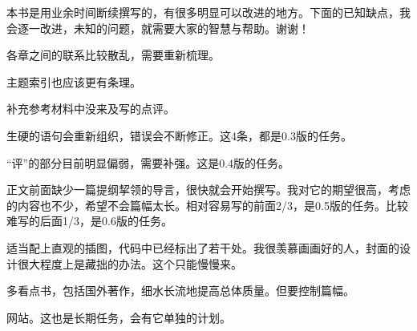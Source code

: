 本书是用业余时间断续撰写的，有很多明显可以改进的地方。下面的已知缺点，我会逐一改进，未知的问题，就需要大家的智慧与帮助。谢谢！
\begin{lyenumerate}
\item 各章之间的联系比较散乱，需要重新梳理。
\item 主题索引也应该更有条理。
\item 补充参考材料中没来及写的点评。
\item 生硬的语句会重新组织，错误会不断修正。这4条，都是0.3版的任务。
\item “评”的部分目前明显偏弱，需要补强。这是0.4版的任务。
\item 正文前面缺少一篇提纲挈领的导言，很快就会开始撰写。我对它的期望很高，考虑的内容也不少，希望不会篇幅太长。相对容易写的前面2/3，是0.5版的任务。比较难写的后面1/3，是0.6版的任务。
\item 适当配上直观的插图，代码中已经标出了若干处。我很羡慕画画好的人，封面的设计很大程度上是藏拙的办法。这个只能慢慢来。
\item 多看点书，包括国外著作，细水长流地提高总体质量。但要控制篇幅。
\item 网站。这也是长期任务，会有它单独的计划。
\end{lyenumerate}

